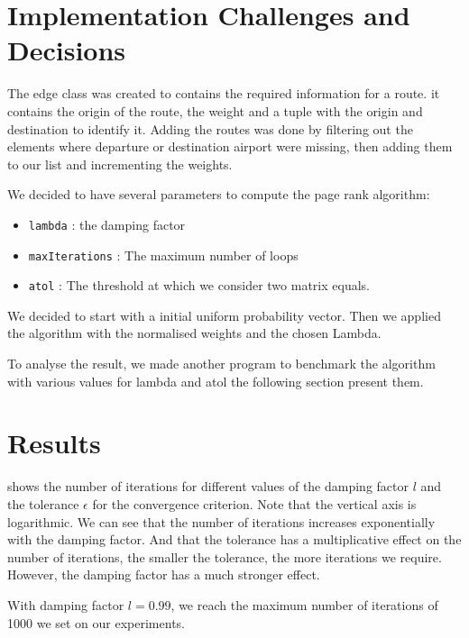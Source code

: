 \section*{Implementation Challenges and Decisions}
The edge class was created to contains the required information for a route. it contains the origin of the route, the weight and a tuple with the origin and destination to identify it.
Adding the routes was done by filtering out the elements where departure or destination airport were missing, then adding them to our list and incrementing the weights.

We decided to have several parameters to compute the page rank algorithm:
\begin{itemize}\itemsep0em
    \item \texttt{lambda} : the damping factor
    \item \texttt{maxIterations} : The maximum number of loops
    \item \texttt{atol} : The threshold at which we consider two matrix equals.
\end{itemize}


We decided to start with a initial uniform probability vector.
Then we applied the algorithm with the normalised weights and the chosen Lambda.

To analyse the result, we made another program to benchmark the algorithm with various values for lambda and atol the following section present them.

\section*{Results}

 shows the number of iterations for different
values of the damping factor $l$ and the tolerance $\epsilon$ for the
convergence criterion. Note that the vertical axis is logarithmic.
We can see that the number of iterations increases exponentially with
the damping factor. And that the tolerance has a multiplicative effect
on the number of iterations, the smaller the tolerance, the more
iterations we require. However, the damping factor has a much
stronger effect.

With damping factor $l=0.99$, we reach the maximum number of iterations
of 1000 we set on our experiments.

